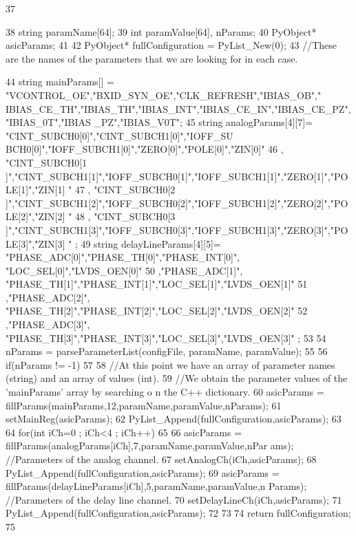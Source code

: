 \begin{DoxyCode}
37 {
38     string paramName[64];
39     int paramValue[64], nParams;
40     PyObject* asicParams;
41 
42     PyObject* fullConfiguration = PyList_New(0);
43     //These are the names of the parameters that we are looking for in each case.
      
44     string mainParams[] = {"VCONTROL_OE","BXID_SYN_OE","CLK_REFRESH","IBIAS_OB","
      IBIAS_CE_TH","IBIAS_TH","IBIAS_INT","IBIAS_CE_IN","IBIAS_CE_PZ","IBIAS_0T","IBIAS
      _PZ","IBIAS_V0T"};
45     string analogParams[4][7]=      { {"CINT_SUBCH0[0]","CINT_SUBCH1[0]","IOFF_SU
      BCH0[0]","IOFF_SUBCH1[0]","ZERO[0]","POLE[0]","ZIN[0]"}
46                                                                 , {"CINT_SUBCH0[1
      ]","CINT_SUBCH1[1]","IOFF_SUBCH0[1]","IOFF_SUBCH1[1]","ZERO[1]","POLE[1]","ZIN[1]
      "}
47                                                                 , {"CINT_SUBCH0[2
      ]","CINT_SUBCH1[2]","IOFF_SUBCH0[2]","IOFF_SUBCH1[2]","ZERO[2]","POLE[2]","ZIN[2]
      "}
48                                                                 , {"CINT_SUBCH0[3
      ]","CINT_SUBCH1[3]","IOFF_SUBCH0[3]","IOFF_SUBCH1[3]","ZERO[3]","POLE[3]","ZIN[3]
      "}           };
49     string delayLineParams[4][5]= { {"PHASE_ADC[0]","PHASE_TH[0]","PHASE_INT[0]",
      "LOC_SEL[0]","LVDS_OEN[0]"}
50                                                                 ,{"PHASE_ADC[1]",
      "PHASE_TH[1]","PHASE_INT[1]","LOC_SEL[1]","LVDS_OEN[1]"}
51                                                                 ,{"PHASE_ADC[2]",
      "PHASE_TH[2]","PHASE_INT[2]","LOC_SEL[2]","LVDS_OEN[2]"}
52                                                                 ,{"PHASE_ADC[3]",
      "PHASE_TH[3]","PHASE_INT[3]","LOC_SEL[3]","LVDS_OEN[3]"}                };
53 
54     nParams = parseParameterList(configFile, paramName, paramValue);
55 
56     if(nParams != -1)
57     {
58         //At this point we have an array of parameter names (string) and an array
       of values (int).
59         //We obtain the parameter values of the 'mainParams' array by searching o
      n the C++ dictionary.
60         asicParams = fillParams(mainParams,12,paramName,paramValue,nParams);
61         setMainReg(asicParams);
62         PyList_Append(fullConfiguration,asicParams);
63 
64         for(int iCh=0 ; iCh<4 ; iCh++)
65         {
66             asicParams = fillParams(analogParams[iCh],7,paramName,paramValue,nPar
      ams);           //Parameters of the analog channel.
67             setAnalogCh(iCh,asicParams);
68             PyList_Append(fullConfiguration,asicParams);
69             asicParams = fillParams(delayLineParams[iCh],5,paramName,paramValue,n
      Params);        //Parameters of the delay line channel.
70             setDelayLineCh(iCh,asicParams);     
71             PyList_Append(fullConfiguration,asicParams);
72         }
73     }
74     return fullConfiguration;
75 }
\end{DoxyCode}
